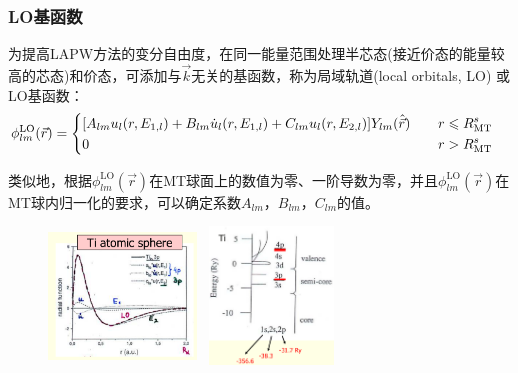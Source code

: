 \frame
{
\frametitle{\textrm{LO}基函数}
为提高\textrm{LAPW}方法的变分自由度，在同一能量范围处理半芯态(接近价态的能量较高的芯态)和价态，可添加与$\vec k$无关的基函数，称为局域轨道(\textrm{local orbitals, LO})%
或\textrm{LO}基函数：
{
{\fontsize{8.5pt}{4.5pt}\selectfont
$$\hskip -10pt \phi_{lm}^{\mathrm{LO}}(\vec r)=\left\{
  \begin{aligned}
    &[A_{lm}u_l(r,E_{1,l})+B_{lm}\dot u_l(r,E_{1,l})+C_{lm}u_l(r,E_{2,l})]Y_{lm}(\hat{\vec r})\quad&r\leqslant R_{\mathrm{MT}}^s\\
    &0 &r>R_{\mathrm{MT}}^s
\end{aligned}
\right.$$}}

类似地，根据$\phi_{lm}^{\mathrm{LO}}(\vec r)$在\textrm{MT}球面上的数值为零、一阶导数为零，并且$\phi_{lm}^{\mathrm{LO}}(\vec r)$在\textrm{MT}球内归一化的要求，可以确定系数$A_{lm}$，$B_{lm}$，$C_{lm}$的值。
\begin{figure}[h!]
	\vspace{-15pt}
\centering
\hspace{15pt}
\includegraphics[height=1.45in,width=1.55in,viewport=50 10 470 415,clip]{Figures/WIEN2k-lo.png}
\includegraphics[height=1.45in,width=1.45in,viewport=5 1 570 570,clip]{Figures/semi-core.png}
\caption{\tiny \textrm{}}%
\label{Muffin_tin_LO}
\end{figure}
}

